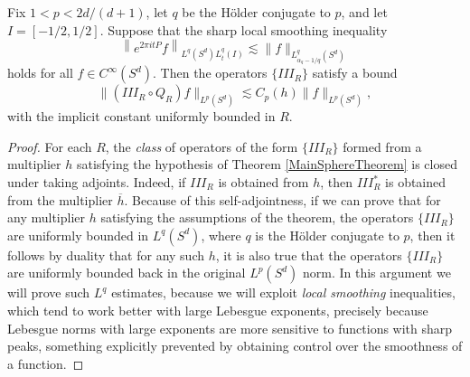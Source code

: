 \begin{lemma} \label{LocalSmoothingLargeTimesTheorem}
    Fix $1 < p < 2d/(d+1)$, let $q$ be the H\"{o}lder conjugate to $p$, and let $I = [-1/2, 1/2]$. Suppose that the sharp local smoothing inequality
    \[ \left\| e^{2 \pi i t P} f \right\|_{L^q(S^d) L^q_t(I)} \lesssim \| f \|_{L^q_{\alpha_q-1/q}(S^d)} \]
    holds for all $f \in C^\infty(S^d)$. Then the operators $\{ III_R \}$ satisfy a bound
    \[ \| (III_R \circ Q_R) f \|_{L^p(S^d)} \lesssim C_p(h) \| f \|_{L^p(S^d)}, \]
    with the implicit constant uniformly bounded in $R$.
\end{lemma}
\begin{proof}
    For each $R$, the \emph{class} of operators of the form $\{ III_R \}$ formed from a multiplier $h$ satisfying the hypothesis of Theorem \ref{MainSphereTheorem} is closed under taking adjoints. Indeed, if $III_R$ is obtained from $h$, then $III_R^*$ is obtained from the multiplier $\overline{h}$. Because of this self-adjointness, if we can prove that for any multiplier $h$ satisfying the assumptions of the theorem, the operators $\{ III_R \}$ are uniformly bounded in $L^q(S^d)$, where $q$ is the H\"{o}lder conjugate to $p$, then it follows by duality that for any such $h$, it is also true that the operators $\{ III_R \}$ are uniformly bounded back in the original $L^p(S^d)$ norm. In this argument we will prove such $L^q$ estimates, because we will exploit \emph{local smoothing} inequalities, which tend to work better with large Lebesgue exponents, precisely because Lebesgue norms with large exponents are more sensitive to functions with sharp peaks, something explicitly prevented by obtaining control over the smoothness of a function.


\end{proof}
